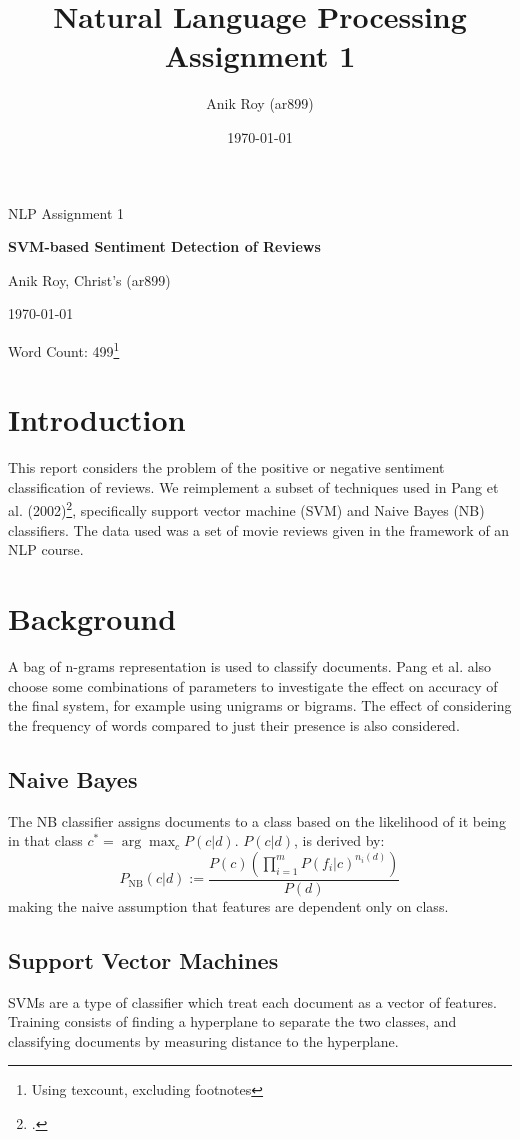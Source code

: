 \documentclass[12pt,a4paper]{article}
\title{
  Natural Language Processing \\
  \large Assignment 1}
\author{Anik Roy (ar899)}
\date{\today}
\begin{document}
\centerline{\large NLP Assignment 1}
\vspace{0.2in}
\centerline{\Large\bf SVM-based Sentiment Detection of Reviews}
\vspace{0.1in}
\centerline{\large {Anik Roy, Christ's (ar899)}}
\vspace{0.1in}
\centerline{\large {\today}}
\vspace{0.05in}
\centerline{Word Count: 499\footnote{Using texcount, excluding footnotes}}
\vspace{0.2in}


\begin{multicols}{2}
  
\section{Introduction}

This report considers the problem of the positive or negative sentiment classification of reviews. We reimplement a subset of techniques used in Pang et al. (2002)\footcite{pang2002thumbs}, specifically support vector machine (SVM) and Naive Bayes (NB) classifiers. The data used was a set of movie reviews given in the framework of an NLP course.

\section{Background}

A bag of n-grams representation is used to classify documents. Pang et al. also choose some combinations of parameters to investigate the effect on accuracy of the final system, for example using unigrams or bigrams. The effect of considering the frequency of words compared to just their presence is also considered.

\subsection{Naive Bayes}
The NB classifier assigns documents to a class based on the likelihood of it being in that class $c^{*} = \arg \max_{c}P(c | d)$. $P(c | d)$, is derived by:
\[P_\mathrm{NB}(c | d) := \frac{P(c)(\prod^{m}_{i=1}P(f_{i} | c)^{n_{i}(d)})}{P(d)} \]
making the naive assumption that features are dependent only on class.

\subsection{Support Vector Machines}
SVMs are a type of classifier which treat each document as a vector of features. Training consists of finding a hyperplane to separate the two classes, and classifying documents by measuring distance to the hyperplane.


\end{multicols}
\end{document}
